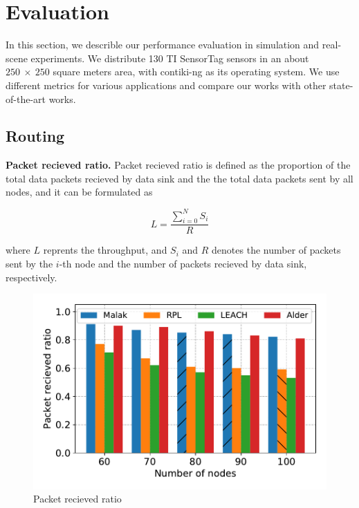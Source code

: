 \section{Evaluation}
\label{Eva}

In this section, we describle our performance evaluation in simulation and
real-scene experiments. We distribute 130 TI SensorTag sensors in an about
$250~\times~250$ square meters area, with contiki-ng as its operating system. We
use different metrics for various applications and compare our works with other
state-of-the-art works.

\subsection{Routing}

\textbf{Packet recieved ratio.}
Packet recieved ratio is defined as the proportion of the total data packets
recieved by data sink and the the total data packets sent by all nodes, and it
can be formulated as

\begin{equation}
	L = \frac{\sum_{i = 0}^{N}S_i}{R}
\end{equation}

where $L$ reprents the throughput, and $S_i$ and $R$ denotes the number of
packets sent by the $i$-th node and the number of packets recieved by data
sink, respectively.


\begin{figure}[htbp]
	\centering
	\includegraphics[width=.85\columnwidth]{Figure/packet_loss_ratio_with_size}
	\vspace{-0.1in}
	\caption{Packet recieved ratio
		\textnormal{
		}}
	\label{fig:packet_loss_ratio_with_size}
\end{figure}

